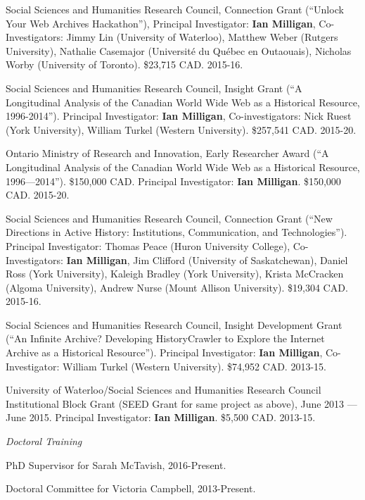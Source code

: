 \documentclass[11pt,article,oneside]{memoir}
\begin{document}
\ind Social Sciences and Humanities Research Council, Connection Grant (``Unlock Your Web Archives Hackathon''), Principal Investigator: \textbf{Ian Milligan}, Co-Investigators: Jimmy Lin (University of Waterloo), Matthew Weber (Rutgers University), Nathalie Casemajor (Universit\'e du Qu\'ebec en Outaouais), Nicholas Worby (University of Toronto). \$23,715 CAD. 2015-16.

\ind Social Sciences and Humanities Research Council, Insight Grant (``A Longitudinal Analysis of the Canadian World Wide Web as a Historical Resource, 1996-2014''). Principal Investigator: \textbf{Ian Milligan}, Co-investigators: Nick Ruest (York University), William Turkel (Western University). \$257,541 CAD. 2015-20.

\ind Ontario Ministry of Research and Innovation, Early Researcher Award (``A Longitudinal Analysis of the Canadian World Wide Web as a Historical Resource, 1996---2014''). \$150,000 CAD. Principal Investigator: \textbf{Ian Milligan}. \$150,000 CAD. 2015-20.

\ind Social Sciences and Humanities Research Council, Connection Grant (``New Directions in Active History: Institutions, Communication, and Technologies''). Principal Investigator: Thomas Peace (Huron University College), Co-Investigators: \textbf{Ian Milligan}, Jim Clifford (University of Saskatchewan), Daniel Ross (York University), Kaleigh Bradley (York University), Krista McCracken (Algoma University), Andrew Nurse (Mount Allison University). \$19,304 CAD. 2015-16.

\ind Social Sciences and Humanities Research Council, Insight Development Grant (``An Infinite Archive? Developing HistoryCrawler to Explore the Internet Archive as a Historical Resource''). Principal Investigator: \textbf{Ian Milligan}, Co-Investigator: William Turkel (Western University).  \$74,952 CAD. 2013-15.

\ind University of Waterloo/Social Sciences and Humanities Research Council Institutional Block Grant (SEED Grant for same project as above), June 2013 --- June 2015. Principal Investigator: \textbf{Ian Milligan}. \$5,500 CAD. 2013-15.
\medskip 


\medskip
\noindent\emph{Doctoral Training \vspace{0.01in}}

\ind PhD Supervisor for Sarah McTavish, 2016-Present.

\ind Doctoral Committee for Victoria Campbell, 2013-Present.
\end{document}
